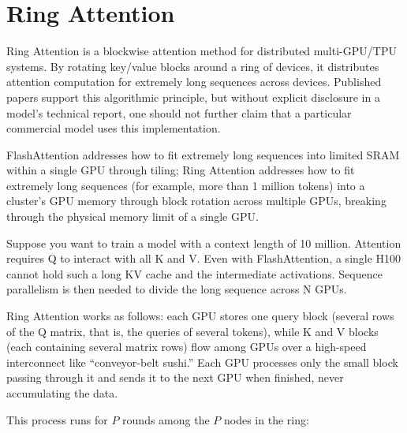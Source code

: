 \setcounter{section}{2}

\hypertarget{ring-attention}{%
\section{Ring Attention}\label{ring-attention}}

Ring Attention is a blockwise attention method for distributed multi-GPU/TPU systems. By rotating key/value blocks around a ring of devices, it distributes attention computation for extremely long sequences across devices. Published papers support this algorithmic principle, but without explicit disclosure in a model's technical report, one should not further claim that a particular commercial model uses this implementation.

FlashAttention addresses how to fit extremely long sequences into limited SRAM within a single GPU through tiling; Ring Attention addresses how to fit extremely long sequences (for example, more than 1 million tokens) into a cluster's GPU memory through block rotation across multiple GPUs, breaking through the physical memory limit of a single GPU.

Suppose you want to train a model with a context length of 10 million. Attention requires Q to interact with all K and V. Even with FlashAttention, a single H100 cannot hold such a long KV cache and the intermediate activations. Sequence parallelism is then needed to divide the long sequence across N GPUs.

Ring Attention works as follows: each GPU stores one query block (several rows of the Q matrix, that is, the queries of several tokens), while K and V blocks (each containing several matrix rows) flow among GPUs over a high-speed interconnect like ``conveyor-belt sushi.'' Each GPU processes only the small block passing through it and sends it to the next GPU when finished, never accumulating the data.

This process runs for \(P\) rounds among the \(P\) nodes in the ring:

